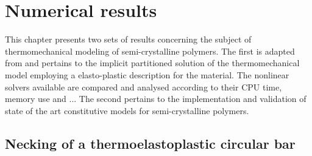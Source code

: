 \chapter{Numerical results} \label{sec:numerical_results}

This chapter presents two sets of results concerning the subject of thermomechanical modeling of semi-crystalline polymers.
The first is adapted from \cite{vilacha} and pertains to the implicit partitioned solution of the thermomechanical model employing a elasto-plastic description for the material.
The nonlinear solvers available are compared and analysed according to their CPU time, memory use and ...
The second pertains to the implementation and validation of state of the art constitutive models for semi-crystalline polymers.


\section{Necking of a thermoelastoplastic circular bar}
     \label{sec:mech-driv-probl}


